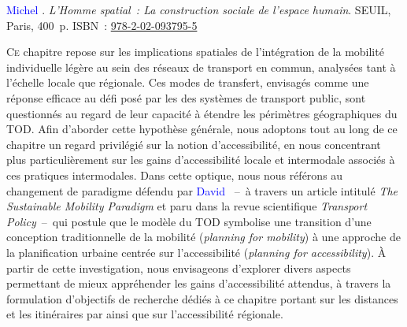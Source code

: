 \begin{refsegment}
\begin{displayquote}
\textcolor{blue}{Michel} \textcolor{blue}{\textcite[347]{lussault_homme_2007}}. \textsl{L’Homme spatial~: La construction sociale de l’espace humain}. SEUIL, Paris, 400~p. ISBN~: \href{https://search.worldcat.org/fr/title/300390192}{978-2-02-093795-5}
    \end{displayquote}

\lettrine[lines=3, findent=8pt, nindent=0pt]{ C}{e} chapitre repose sur les implications spatiales de l'intégration de la mobilité individuelle légère au sein des réseaux de \gls{transport en commun}, analysées tant à l'échelle locale que régionale. Ces modes de transfert, envisagés comme une réponse efficace au défi posé par les  des systèmes de transport public, sont questionnés au regard de leur capacité à étendre les périmètres géographiques du \acrfull{TOD}. Afin d'aborder cette hypothèse générale, nous adoptons tout au long de ce chapitre un regard privilégié sur la notion d'\gls{accessibilité}, en nous concentrant plus particulièrement sur les gains d'accessibilité locale et intermodale associés à ces pratiques intermodales. Dans cette optique, nous nous référons au changement de paradigme défendu par \textcolor{blue}{David} \textcolor{blue}{\textcite[75]{banister_sustainable_2008}}~–~à travers un article intitulé \textsl{The Sustainable Mobility Paradigm} et paru dans la revue scientifique \textsl{Transport Policy}~–~qui postule que le modèle du \acrshort{TOD} symbolise une transition d'une conception traditionnelle de la mobilité (\textsl{planning for mobility}) à une approche de la planification urbaine centrée sur l'accessibilité (\textsl{planning for accessibility}). À partir de cette investigation, nous envisageons d'explorer divers aspects permettant de mieux appréhender les gains d'accessibilité attendus, à travers la formulation d'objectifs de recherche dédiés à ce chapitre portant sur les distances et les itinéraires  par  \textcolor{blue}{\autocite[347]{lussault_homme_2007}} ainsi que sur l'accessibilité régionale.%


\end{refsegment}
